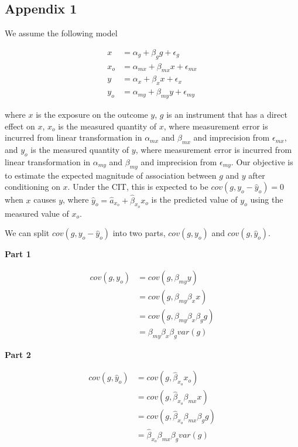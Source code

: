 \documentclass[]{article}
\begin{document}
\newpage

\subsection{Appendix 1}\label{appendix-1}

We assume the following model

\[
\begin{aligned}
x   & = \alpha_g + \beta_g g + \epsilon_g \\
x_o & = \alpha_{mx} + \beta_{mx} x + \epsilon_{mx} \\
y   & = \alpha_x + \beta_x x + \epsilon_x \\
y_o & = \alpha_{my} + \beta_{my} y + \epsilon_{my}
\end{aligned}
\]

where \(x\) is the exposure on the outcome \(y\), \(g\) is an instrument
that has a direct effect on \(x\), \(x_o\) is the measured quantity of
\(x\), where measurement error is incurred from linear transformation in
\(\alpha_{mx}\) and \(\beta_{mx}\) and imprecision from
\(\epsilon_{mx}\), and \(y_o\) is the measured quantity of \(y\), where
measurement error is incurred from linear transformation in
\(\alpha_{my}\) and \(\beta_{my}\) and imprecision from
\(\epsilon_{my}\). Our objective is to estimate the expected magnitude
of association between \(g\) and \(y\) after conditioning on \(x\).
Under the CIT, this is expected to be \(cov(g, y_o - \hat{y}_o) = 0\)
when \(x\) causes \(y\), where
\(\hat{y}_o = \hat{a}_{x_o} + \hat{\beta}_{x_o} x_o\) is the predicted
value of \(y_o\) using the measured value of \(x_o\).

We can split \(cov(g, y_o - \hat{y}_o)\) into two parts, \(cov(g, y_o)\)
and \(cov(g, \hat{y}_o)\).

\textbf{Part 1}

\[
\begin{aligned}
cov(g, y_o) & = cov(g, \beta_{my} y) \\
            & = cov(g, \beta_{my} \beta_x x) \\
            & = cov(g, \beta_{my} \beta_x \beta_g g) \\
            & = \beta_{my} \beta_x \beta_g var(g)
\end{aligned}
\]

\textbf{Part 2}

\[
\begin{aligned}
cov(g, \hat{y}_o) & = cov(g, \hat{\beta}_{x_o} x_o) \\
                  & = cov(g, \hat{\beta}_{x_o} \beta_{mx} x) \\
                  & = cov(g, \hat{\beta}_{x_o} \beta_{mx} \beta_g g) \\
                  & = \hat{\beta}_{x_o} \beta_{mx} \beta_g var(g)
\end{aligned}
\]
\end{document}
